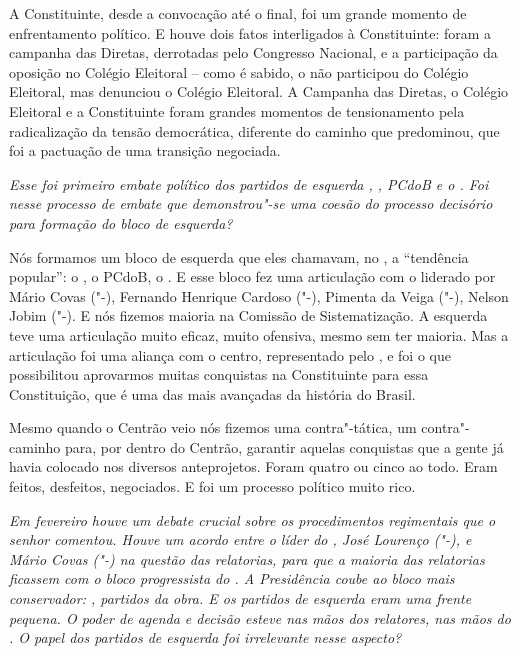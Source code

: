A Constituinte, desde a convocação até o final, foi um grande momento de
enfrentamento político. E houve dois fatos interligados à Constituinte:
foram a campanha das Diretas, derrotadas pelo Congresso Nacional, e a
participação da oposição no Colégio Eleitoral -- como é sabido, o  não
participou do Colégio Eleitoral, mas denunciou o Colégio Eleitoral. A
Campanha das Diretas, o Colégio Eleitoral e a Constituinte foram grandes
momentos de tensionamento pela radicalização da tensão democrática,
diferente do caminho que predominou, que foi a pactuação de uma
transição negociada.

\medskip

\noindent\emph{Esse foi primeiro embate político dos partidos de esquerda ,
, PCdoB e o . Foi nesse processo de embate que demonstrou"-se uma
coesão do processo decisório para formação do bloco de esquerda?}

Nós formamos um bloco de esquerda que eles chamavam,
no , a ``tendência popular'': o
, o PCdoB, o . E esse bloco fez
uma articulação com o  liderado por
Mário Covas ("-), Fernando
Henrique Cardoso ("-), Pimenta
da Veiga ("-), Nelson Jobim
("-). E nós fizemos maioria na Comissão de Sistematização. A
esquerda teve uma articulação muito eficaz, muito ofensiva, mesmo sem
ter maioria. Mas a articulação foi uma aliança com o centro,
representado pelo , e foi o que possibilitou aprovarmos muitas
conquistas na Constituinte para essa Constituição, que é uma das mais
avançadas da história do Brasil.

Mesmo quando o Centrão veio nós fizemos uma contra"-tática, um
contra"-caminho para, por dentro do Centrão, garantir aquelas conquistas
que a gente já havia colocado nos diversos anteprojetos. Foram quatro ou
cinco ao todo. Eram feitos, desfeitos, negociados. E foi um processo
político muito rico.

\medskip

\noindent\emph{Em fevereiro houve um debate crucial sobre os procedimentos
regimentais que o senhor comentou. Houve um acordo entre o líder do ,
José Lourenço ("-), e Mário
Covas ("-) na questão das
relatorias, para que a maioria das relatorias ficassem com o bloco
progressista do . A Presidência coube ao bloco mais conservador:
, partidos da obra. E os partidos de esquerda eram uma frente
pequena. O poder de agenda e decisão esteve nas mãos dos relatores, nas
mãos do . O papel dos partidos de esquerda foi irrelevante nesse
aspecto?}

